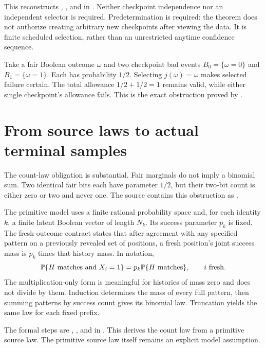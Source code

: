 This reconstructs ,
, and
 in
. Neither checkpoint independence nor
an independent selector is required. Predetermination is required: the theorem
does not authorize creating arbitrary new checkpoints after viewing the data.
It is finite scheduled selection, rather than an unrestricted anytime
confidence sequence.

\begin{example}
Take a fair Boolean outcome $\omega$ and two checkpoint bad events
$B_0=\{\omega=0\}$ and $B_1=\{\omega=1\}$. Each has probability $1/2$.
Selecting $j(\omega)=\omega$ makes selected failure certain. The total allowance
$1/2+1/2=1$ remains valid, while either single checkpoint's allowance fails.
This is the exact obstruction proved by
.
\end{example}

\section{From source laws to actual terminal samples}
\label{sec:recorder}

The count-law obligation is substantial. Fair marginals do not imply a binomial
sum. Two identical fair bits each have parameter $1/2$, but their two-bit count
is either zero or two and never one. The source contains this obstruction as
.

The primitive model uses a finite rational probability space and, for each
identity $k$, a finite latent Boolean vector of length $N_k$. Its success
parameter $p_k$ is fixed. The fresh-outcome contract states that after agreement
with any specified pattern on a previously revealed set of positions, a fresh
position's joint success mass is $p_k$ times that history mass. In notation,
\[
 \mathbb P\{H\text{ matches and }X_i=1\}=p_k\mathbb P\{H\text{ matches}\},
 \qquad i\text{ fresh}.
\]
The multiplication-only form is meaningful for histories of mass zero and does
not divide by them. Induction determines the mass of every full pattern, then
summing patterns by success count gives its binomial law. Truncation yields the
same law for each fixed prefix.

The formal steps are ,
, and
 in
. This derives the count law from a
primitive source law. The primitive source law itself remains an explicit
model assumption.

